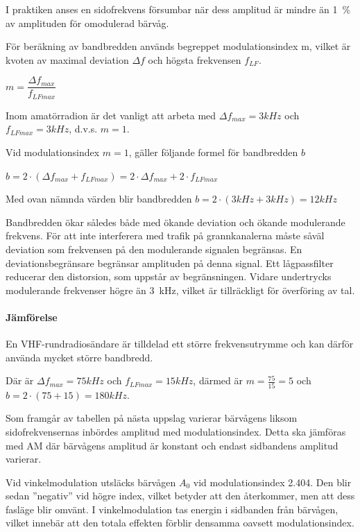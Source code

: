 I praktiken anses en sidofrekvens försumbar när dess amplitud är mindre än 1~\%
av amplituden för omodulerad bärvåg.

För beräkning av bandbredden används begreppet modulationsindex m, vilket är
kvoten av maximal deviation \(\Delta f\) och högsta frekvensen \(f_{LF}\).

\(m = \dfrac{\Delta f_{max}}{f_{LFmax}}\)

Inom amatörradion är det vanligt att arbeta med \(\Delta f_{max} = 3 kHz\) och
\(f_{LFmax} = 3 kHz\), d.v.s. \(m = 1\).

Vid modulationsindex \(m = 1\), gäller följande
formel för bandbredden \(b\)

\(b = 2 \cdot ( \Delta f_{max} + f_{LFmax}) = 2 \cdot \Delta f_{max}
 + 2 \cdot f_{LFmax}\)

Med ovan nämnda värden blir bandbredden \(b = 2 \cdot (3 kHz + 3 kHz)
 = 12 kHz\)

Bandbredden ökar således både med ökande deviation och ökande modulerande
frekvens. För att inte interferera med trafik på grannkanalerna måste såväl
deviation som frekvensen på den modulerande signalen begränsas. En
deviationsbegränsare begränsar amplituden på denna signal. Ett lågpassfilter
reducerar den distorsion, som uppstår av begränsningen. Vidare undertrycks
modulerande frekvenser högre än 3~kHz, vilket är tillräckligt för överföring
av tal.

\paragraph{Jämförelse}

En VHF-rundradiosändare är tilldelad ett större frekvensutrymme och kan därför
använda mycket större bandbredd.

Där är \(\Delta f_{max} = 75 kHz\) och \(f_{LFmax} =15 kHz\), därmed är
\(m = \frac{75}{15} = 5\) och \(b = 2 \cdot (75 + 15) = 180 kHz\).

Som framgår av tabellen på nästa uppslag varierar bärvågens liksom
sidofrekvensernas inbördes amplitud med modulationsindex. Detta ska jämföras
med AM där bärvågens amplitud är konstant och endast sidbandens amplitud
varierar.

Vid vinkelmodulation utsläcks bärvågen \(A_0\) vid modulationsindex 2.404. Den
blir sedan ''negativ'' vid högre index, vilket betyder att den återkommer, men
att dess fasläge blir omvänt. I vinkelmodulation tas energin i sidbanden från
bärvågen, vilket innebär att den totala effekten förblir densamma oavsett
modulationsindex.

